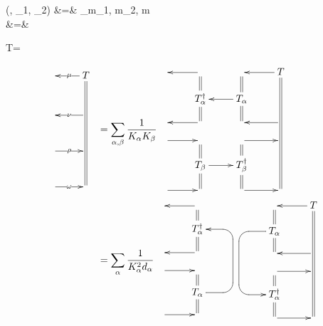 \beqa
\tau(\lam, \lam_1, \lam_2)
&=&
\sum_{m_1, m_2, m}
\\
&=&
\bcen
{}\ecen
\eeqa

\beq
T=
\bcen
{}
\ecen
\eeq

\begin{align}
\bcen
\xymatrix@R=1pc{
&T\ar@2{-}[dddddd]
\ar[l]|\mu
\\&
\\
&\ar[l]|\nu
\\&
\\
\ar[r]|\rho&
\\&
\\
\ar[r]|\omega&
}
\ecen
&=
\sum_{\alp, \beta}
\frac{1}{K_\alp K_\beta}
\bcen
\xymatrix@R=1pc{
&\ar[l]&&T
\ar@2{-}[ddddd]
\ar[l]
\\
&T_\alp^\dagger\ar@2{-}[u]
\ar@2{-}[d]&T_\alp\ar@2{-}[u]
\ar@2{-}[d]
\ar[l]
&
\\
&\ar[l]&&\ar[l]
\\
\ar[r]&&\ar[r]&
\\
&T_\beta
\ar@2{-}[u]
\ar@2{-}[d]
\ar[r]
&T_\beta^\dagger\ar@2{-}[u]
\ar@2{-}[d]
&
\\
\ar[r]&&\ar[r]&
}
\ecen
\\
&=
\sum_{\alp}
\frac{1}{K^2_\alp d_\alp}
\bcen
\xymatrix@R=1pc{
&\ar[l]&
\\
&T_\alp^\dagger\ar@2{-}[u]
\ar@2{-}[d]
&
\\
&\ar[l]&
\\
\ar[r]&&
\\
&T_\alp
\ar@2{-}[u]
\ar@2{-}[d]
\ar`r[ruuu]
`[uuu][uuu]
&
\\
\ar[r]&&
}
\xymatrix@R=1pc{
&&T
\ar@2{-}[ddddd]
\ar[l]
\\
&T_\alp\ar@2{-}[u]
\ar@2{-}[d]
\ar`l[ld]
`[ddd][ddd]
&
\\
&&\ar[l]
\\
&\ar[r]&
\\
&T_\alp^\dagger\ar@2{-}[u]
\ar@2{-}[d]
&
\\
&\ar[r]&
}
\ecen
\end{align}


